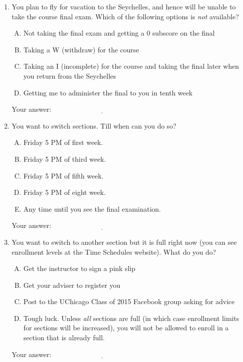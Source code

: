 \documentclass[10pt]{amsart}
\begin{document}
\begin{enumerate}
\item You plan to fly for vacation to the Seychelles, and hence will
  be unable to take the course final exam. Which of the following
  options is {\em not} available?

  \begin{enumerate}[(A)]
  \item Not taking the final exam and getting a $0$ subscore on the final
  \item Taking a W (withdraw) for the course
  \item Taking an I (incomplete) for the course and taking the final
    later when you return from the Seychelles
  \item Getting me to administer the final to you in tenth week
  \end{enumerate}

  \vspace{0.1in}
  Your answer: $\underline{\qquad\qquad\qquad\qquad\qquad\qquad\qquad}$
  \vspace{0.1in}

\item You want to switch sections. Till when can you do so?

  \begin{enumerate}[(A)]
  \item Friday 5 PM of first week.
  \item Friday 5 PM of third week.
  \item Friday 5 PM of fifth week.
  \item Friday 5 PM of eight week.
  \item Any time until you see the final examination.
  \end{enumerate}

  \vspace{0.1in}
  Your answer: $\underline{\qquad\qquad\qquad\qquad\qquad\qquad\qquad}$
  \vspace{0.1in}

\item You want to switch to another section but it is full right now
  (you can see enrollment levels at the Time Schedules website). What do
  you do?

  \begin{enumerate}[(A)]
  \item Get the instructor to sign a pink slip
  \item Get your adviser to register you
  \item Post to the UChicago Class of 2015 Facebook group asking for
    advice
  \item Tough luck. Unless {\em all} sections are full (in which case
    enrollment limits for sections will be increased), you will not be
    allowed to enroll in a section that is already full.
  \end{enumerate}

  \vspace{0.1in}
  Your answer: $\underline{\qquad\qquad\qquad\qquad\qquad\qquad\qquad}$
  \vspace{0.1in}

\end{enumerate}
\end{document}
